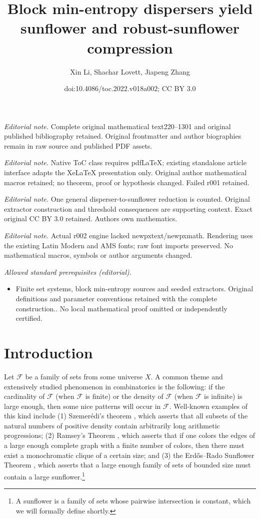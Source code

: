 \documentclass[11pt]{article}
\title{Block min-entropy dispersers yield sunflower and robust-sunflower compression}
\author{Xin Li, Shachar Lovett, Jiapeng Zhang}
\date{doi:10.4086/toc.2022.v018a002; CC BY 3.0}
\numberwithin{equation}{section}
\theoremstyle{definition}
\theoremstyle{plain}
\newcommand{\calF}{\mathcal{F}} %
\begin{document}
\maketitle
\noindent\textit{Editorial note.} Complete original mathematical text220--1301 and original published bibliography retained. Original frontmatter and author biographies remain in raw source and published PDF assets.\par\medskip
\noindent\textit{Editorial note.} Native ToC class requires pdfLaTeX; existing standalone article interface adapts the XeLaTeX presentation only. Original author mathematical macros retained; no theorem, proof or hypothesis changed. Failed r001 retained.\par\medskip
\noindent\textit{Editorial note.} One general disperser-to-sunflower reduction is counted. Original extractor construction and threshold consequences are supporting context. Exact original CC BY 3.0 retained. Authors own mathematics.\par\medskip
\noindent\textit{Editorial note.} Actual r002 engine lacked newpxtext/newpxmath. Rendering uses the existing Latin Modern and AMS fonts; raw font imports preserved. No mathematical macros, symbols or author arguments changed.\par\medskip
\noindent\textit{Allowed standard prerequisites (editorial).}\begin{itemize}
\item Finite set systems, block min-entropy sources and seeded extractors. Original definitions and parameter conventions retained with the complete construction.. No local mathematical proof omitted or independently certified.
\end{itemize}\medskip
\section{Introduction} \label{sec:intro}

Let $\calF$ be a family of sets from some universe $X$. A common theme and extensively studied phenomenon in combinatorics is the
following: if the cardinality of $\calF$ (when $\calF$ is finite) or the density of $\calF$ (when $\calF$ is infinite) is
large enough, then some nice patterns will occur in $\calF$. Well-known examples of this kind include (1) Szemer\'{e}di's theorem
\cite{Szemerdi1975}, which asserts that all subsets of the natural numbers of positive density contain arbitrarily long arithmetic progressions; (2)
Ramsey's Theorem \cite{ErdosS1935}, which asserts that if one colors the edges of a large enough complete graph with a finite number of colors, then
there must exist a monochromatic clique of a certain size; and (3) the Erd\H{o}s--Rado Sunflower Theorem \cite{ErdosR1960}, which asserts that a large
enough family of sets of bounded size must contain a large sunflower.\footnote{A sunflower is a family of sets whose
pairwise intersection is constant, which we will formally define shortly.}
\end{document}
